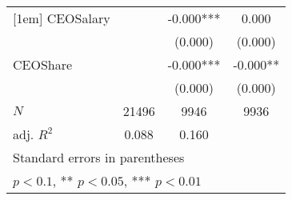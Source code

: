 \begin{table}[htbp]
\begin{tabular}{l*{3}{c}}
[1em]
CEOSalary   &               &      -0.000***&       0.000   \\
            &               &     (0.000)   &     (0.000)   \\
[1em]
CEOShare    &               &      -0.000***&      -0.000** \\
            &               &     (0.000)   &     (0.000)   \\
\hline
\(N\)       &       21496   &        9946   &        9936   \\
adj. \(R^{2}\)&       0.088   &       0.160   &               \\
\hline\hline
\multicolumn{4}{l}{\footnotesize Standard errors in parentheses}\\
\multicolumn{4}{l}{\footnotesize * \(p<0.1\), ** \(p<0.05\), *** \(p<0.01\)}\\
\end{tabular}
\end{table}
